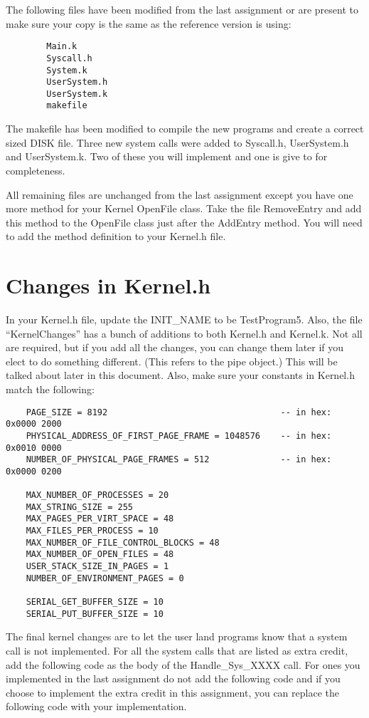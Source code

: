 \documentclass[11pt]{article}
\begin{document}
The following files have been modified from the last assignment or are present to make sure your copy is the same as the reference version is using:

\begin{verbatim}
        Main.k
        Syscall.h
        System.k
        UserSystem.h
        UserSystem.k
        makefile
\end{verbatim}

The makefile has been modified to compile the new programs and
create a correct sized DISK file.  Three new system calls were
added to Syscall.h, UserSystem.h and UserSystem.k.  Two of
these you will implement and one is give to for completeness.

All remaining files are unchanged from the last assignment except you
have one more method for your Kernel OpenFile class.  Take the file
RemoveEntry and add this method to the OpenFile class just after the
AddEntry method.  You will need to add the method definition to your
Kernel.h file.

\section{Changes in Kernel.h}

In your Kernel.h file, update the INIT\_NAME to be TestProgram5.
Also, the file ``KernelChanges'' has a bunch of additions to both
Kernel.h and Kernel.k.  Not all are required, but if you add all the
changes, you can change them later if you elect to do something
different. (This refers to the pipe object.)  This will be talked
about later in this document.  Also, make sure your constants in
Kernel.h match the following:

\begin{verbatim}
    PAGE_SIZE = 8192                                  -- in hex: 0x0000 2000
    PHYSICAL_ADDRESS_OF_FIRST_PAGE_FRAME = 1048576    -- in hex: 0x0010 0000
    NUMBER_OF_PHYSICAL_PAGE_FRAMES = 512              -- in hex: 0x0000 0200
   
    MAX_NUMBER_OF_PROCESSES = 20
    MAX_STRING_SIZE = 255
    MAX_PAGES_PER_VIRT_SPACE = 48
    MAX_FILES_PER_PROCESS = 10
    MAX_NUMBER_OF_FILE_CONTROL_BLOCKS = 48
    MAX_NUMBER_OF_OPEN_FILES = 48
    USER_STACK_SIZE_IN_PAGES = 1
    NUMBER_OF_ENVIRONMENT_PAGES = 0

    SERIAL_GET_BUFFER_SIZE = 10
    SERIAL_PUT_BUFFER_SIZE = 10
\end{verbatim}

The final kernel changes are to let the user land programs know that a
system call is not implemented.  For all the system calls that are
listed as extra credit, add the following code as the body of the
Handle\_Sys\_XXXX call.  For ones you implemented in the last
assignment do not add the following code and if you choose to
implement the extra credit in this assignment, you can replace the
following code with your implementation.
\end{document}
